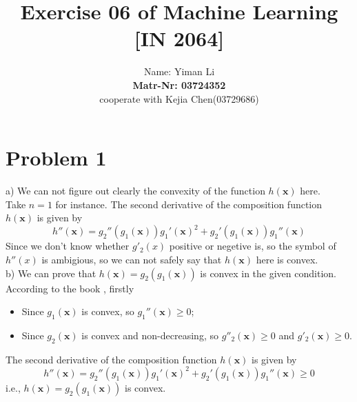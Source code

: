 \documentclass{article}
\title{Exercise 06 of Machine Learning [IN 2064]}
\author{
  Name: Yiman Li \\
  \textbf{Matr-Nr: 03724352} \\
  cooperate with Kejia Chen(03729686)\\
}
\begin{document}
\maketitle

\section*{Problem 1}
a) We can not figure out clearly the convexity of the function $h(\bm{x})$ here. \\
Take $n=1$ for instance. The second derivative of the composition function $h(\bm{x})$ is given by
\begin{equation}
h''(\bm{x}) = g_2''(g_1(\bm{x}))g_1'(\bm{x})^2 + g_2'(g_1(\bm{x}))g_1''(\bm{x})
\end{equation}
Since we don't know whether $g'_2(x)$ positive or negetive is, so the symbol of $h''(x)$ is ambigious, so we can not safely say that $h(\bm{x})$ here is convex.\\

b) We can prove that $h(\bm{x}) = g_2(g_1(\bm{x}))$ is convex in the given condition. \\
According to the book \cite{Boyd:2004:CO:993483}, firstly 
\begin{itemize}
	\item Since $g_1(\bm{x})$ is convex, so $g_1''(\bm{x}) \geq 0$;
	\item Since $g_2(\bm{x})$ is convex and non-decreasing, so $g''_2(\bm{x}) \geq 0 $ and $g'_2(\bm{x}) \geq 0$.
\end{itemize}
The second derivative of the composition function $h(\bm{x})$ is given by
\begin{equation}
	h''(\bm{x}) = g_2''(g_1(\bm{x}))g_1'(\bm{x})^2 + g_2'(g_1(\bm{x}))g_1''(\bm{x}) \geq 0
\end{equation}
i.e., $h(\bm{x}) = g_2(g_1(\bm{x}))$ is convex.\\
\end{document}
